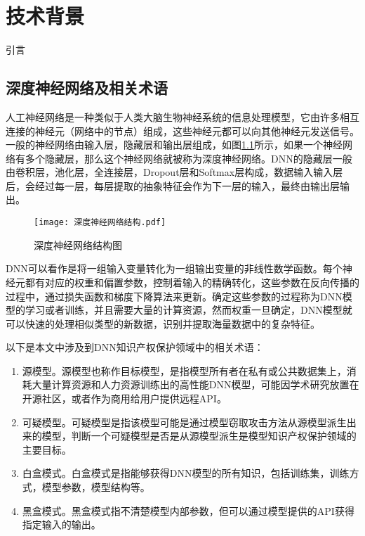 

\chapter{技术背景} 
\label{2}

引言

\section{深度神经网络及相关术语}

人工神经网络是一种类似于人类大脑生物神经系统的信息处理模型，它由许多相互连接的神经元（网络中的节点）组成，这些神经元都可以向其他神经元发送信号。一般的神经网络由输入层，隐藏层和输出层组成，如图\ref{深度神经网络结构图}所示，如果一个神经网络有多个隐藏层，那么这个神经网络就被称为深度神经网络。DNN的隐藏层一般由卷积层，池化层，全连接层，Dropout层和Softmax层构成，数据输入输入层后，会经过每一层，每层提取的抽象特征会作为下一层的输入，最终由输出层输出。

\begin{figure}[htbp]%
	\centering
	\texttt{[image: 深度神经网络结构.pdf]}
	\setlength{\abovecaptionskip}{5mm} %
	\caption{深度神经网络结构图}
	\label{深度神经网络结构图}
\end {figure}

DNN可以看作是将一组输入变量转化为一组输出变量的非线性数学函数。每个神经元都有对应的权重和偏置参数，控制着输入的精确转化，这些参数在反向传播的过程中，通过损失函数和梯度下降算法来更新。确定这些参数的过程称为DNN模型的学习或者训练，并且需要大量的计算资源，然而权重一旦确定，DNN模型就可以快速的处理相似类型的新数据，识别并提取海量数据中的复杂特征。

以下是本文中涉及到DNN知识产权保护领域中的相关术语：

\begin{enumerate}
	\renewcommand{\labelenumi}{\theenumi)}
	\item 源模型。源模型也称作目标模型，是指模型所有者在私有或公共数据集上，消耗大量计算资源和人力资源训练出的高性能DNN模型，可能因学术研究放置在开源社区，或者作为商用给用户提供远程API。
	\item 可疑模型。可疑模型是指该模型可能是通过模型窃取攻击方法从源模型派生出来的模型，判断一个可疑模型是否是从源模型派生是模型知识产权保护领域的主要目标。
	\item 白盒模式。白盒模式是指能够获得DNN模型的所有知识，包括训练集，训练方式，模型参数，模型结构等。
	\item 黑盒模式。黑盒模式指不清楚模型内部参数，但可以通过模型提供的API获得指定输入的输出。
\end{enumerate}



